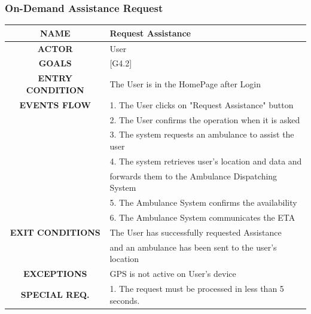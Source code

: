 \documentclass[12pt,a4paper]{article}
\begin{document}
		\subsubsection{On-Demand Assistance Request}
		\begin{center}
			\begin{tabular}{| c | l |}
				\hline
				\textbf{NAME} & Request Assistance \\
				\hline
				\textbf{ACTOR} & User \\
				\hline
				\textbf{GOALS} & [G4.2] \\
				\hline
				\textbf{ENTRY CONDITION} & The User is in the HomePage after Login\\ \hline
				\textbf{EVENTS FLOW}  &
				1. The User clicks on "Request Assistance" button\\
				&2. The User confirms the operation when it is asked\\
				&3. The system requests an ambulance to assist the user\\
				&4. The system retrieves user's location and data and\\
				&forwards them to the Ambulance Dispatching System\\
				&5. The Ambulance System confirms the availability\\
				&6. The Ambulance System communicates the ETA\\
				\hline
				\textbf{EXIT CONDITIONS}  & The User has successfully requested Assistance\\
				& and an ambulance has been sent to the user's location\\ \hline
				\textbf{EXCEPTIONS} &
				GPS is not active on User's device\\ \hline
				\textbf{SPECIAL REQ.} &
				1. The request must be processed in less than 5 seconds.\\
				\hline
			\end{tabular}
		\end{center}
	
		\newpage
\end{document}
